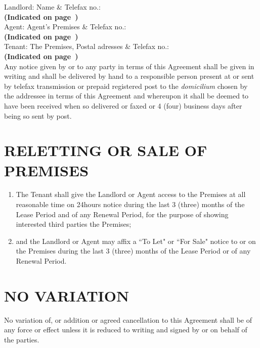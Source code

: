 \documentclass[11pt]{article}
\begin{document}
Landlord: Name \& Telefax  no.: \underline{\hspace{29em}}\\ \textbf{(Indicated on page~\pageref{input:landlord-email})} \\
Agent: Agent's Premises \& Telefax no.: \underline{\hspace{26em}}\\ \textbf{(Indicated on page~\pageref{input:agent-email})} \\
Tenant: The Premises, Postal adresses  \& Telefax no.: \underline{\hspace{20em}}\\ \textbf{(Indicated on page~\pageref{input:tenant-email})} \\

Any notice given by or to any party in terms of this Agreement shall be given in writing and shall be delivered by hand to a responsible person present at or sent by telefax transmission or prepaid registered post to the \textit{domicilium} chosen by the addressee in terms of this Agreement and whereupon it shall be deemed to have been received when so delivered or faxed or 4 (four) business days after being so sent by post.

\section{\uppercase{reletting or sale of premises}}
\label{sec:reletting-or-sale-of-premises}

\begin{enumerate}
	\item The Tenant shall give the Landlord or Agent access to the Premises at all reasonable time on 24hours notice during the last 3 (three) months of the Lease Period and of any Renewal Period, for the purpose of showing interested third parties the Premises;
	\item and the Landlord or Agent may affix a ``To Let" or ``For Sale" notice to or on the Premises during the last 3 (three) months of the Lease Period or of any Renewal Period.
\end{enumerate}

\section{\uppercase{no variation}}
\label{sec:no-variation}

No variation of, or addition or agreed cancellation to this Agreement shall be of any force or effect unless it is reduced to writing and signed by or on behalf of the parties.
\end{document}
